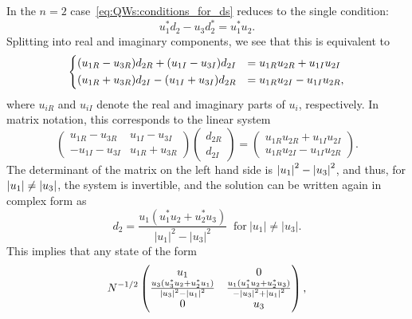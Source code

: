 In the $n=2$ case~\cref{eq:QWs:conditions_for_ds} reduces to the single condition:
\begin{equation}
    u_1^* d_2 - u_3 d_2^* = u_1^* u_2.
\end{equation}
Splitting into real and imaginary components, we see that this is equivalent to
\begin{equation}
    \begin{dcases}
        (u_{1R} - u_{3R})d_{2R} + (u_{1I} - u_{3I})d_{2I} &=
        u_{1R}u_{2R} + u_{1I} u_{2I} \\
        (u_{1R} + u_{3R}) d_{2I} - (u_{1I} + u_{3I}) d_{2R} &=
        u_{1R} u_{2I} - u_{1I} u_{2R},
    \end{dcases}
\end{equation}
where $u_{iR}$ and $u_{iI}$ denote the real and imaginary parts of $u_i$, respectively.
In matrix notation, this corresponds to the linear system
\begin{equation}
    \begin{pmatrix}
        u_{1R} - u_{3R} & u_{1I} - u_{3I} \\
        -u_{1I} - u_{3I} & u_{1R} + u_{3R}
    \end{pmatrix}
    \begin{pmatrix}
        d_{2R} \\ d_{2I}
    \end{pmatrix} =
    \begin{pmatrix}
        u_{1R}u_{2R} + u_{1I} u_{2I} \\
        u_{1R} u_{2I} - u_{1I} u_{2R}
    \end{pmatrix}.
\end{equation}
The determinant of the matrix on the left hand side is $\abs{u_1}^2-\abs{u_3}^2$, and thus, for $\abs{u_1}\neq\abs{u_3}$, the system is invertible, and the solution can be written again in complex form as
\begin{equation}
	d_2 = \frac{
		u_1(u_1^* u_2 + u_2^* u_3)
	}{
		\lvert u_1 \rvert^2 - \lvert u_3 \rvert^2
	}~\text{ for}~\lvert u_1 \rvert \neq \lvert u_3 \rvert.
	\label{eq:QWs:solution_for_d2}
\end{equation}
This implies that any state of the form
\begin{equation}
    N^{-1/2} \begin{pmatrix}
        u_1 & 0 \\
        \frac{u_3(u_3^* u_2 + u_2^* u_1)}{\abs{u_3}^2 - \abs{u_1}^2} &
        \frac{u_1(u_1^* u_2 + u_2^* u_3)}{-\abs{u_3}^2 + \abs{u_1}^2} \\
        0 & u_3
    \end{pmatrix},
    \label{eq:QWs:solution_for_d2_fullstate_matrixform}
\end{equation}
